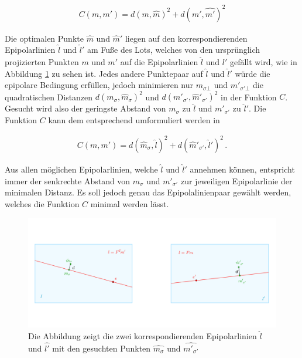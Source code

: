 
\begin{gather}
	C(m,m') = d(m,\hat{m})^2 + d(m',\hat{m'})^2
\end{gather}


Die optimalen Punkte $\hat{m}$ und $\hat{m}'$ liegen auf den korrespondierenden Epipolarlinien $\hat{l}$ und $\hat{l}'$ am Fuße des Lots, welches von den ursprünglich projizierten Punkten $m$ und $m'$ auf die Epipolarlinien $\hat{l}$ und $\hat{l'}$ gefällt wird\cite{HZ}, wie in Abbildung \ref{fig:Lot} zu sehen ist. Jedes andere Punktepaar auf $\hat{l}$ und $\hat{l}'$ würde die epipolare Bedingung erfüllen, jedoch minimieren nur $m_{\sigma\bot}$ und $m'_{\sigma' \bot}$ die quadratischen Distanzen $d(m_\sigma,\hat{m}_\sigma)^2$ und $ d(m'_{\sigma'},\hat{m}'_{\sigma'})^2$ in der Funktion $C$. Gesucht wird also der geringste Abstand von $m_\sigma$ zu $\hat{l}$ und $m'_{\sigma'}$ zu $\hat{l}'$. Die Funktion $C$ kann dem entsprechend umformuliert werden in 

\begin{gather}
	C(m,m') = d(\hat{m}_\sigma,\hat{l})^2 + d(\hat{m}'_{\sigma'},\hat{l}')^2 \, .
\end{gather}


Aus allen möglichen Epipolarlinien, welche $\hat{l}$ und $\hat{l}'$ annehmen können, entspricht immer der senkrechte Abstand von $m_\sigma$ und $m'_{\sigma'}$ zur jeweiligen Epipolarlinie der minimalen Distanz. Es soll jedoch genau das Epipolalinienpaar gewählt werden, welches die Funktion $C$ minimal werden lässt\cite{HZ}.\\


\begin{figure}[!htb]
	\centering
	\includegraphics[width=.8\linewidth]{images/SampsAppxNewPoints.png}
	\caption[Sampson Approximation aufstellen der Kostenfunktion]{Die Abbildung zeigt die zwei korrespondierenden Epipolarlinien $\hat{l}$ und $\hat{l'}$ mit den gesuchten Punkten $\hat{m_\sigma}$ und $\hat{m'_{\sigma'}}$}\label{fig:Lot}
\end{figure}



